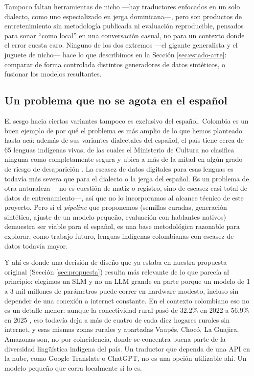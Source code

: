 \documentclass[11pt,a4paper]{article}
\begin{document}
Tampoco faltan herramientas de nicho —hay traductores enfocados en un solo dialecto, como uno especializado en jerga dominicana—, pero son productos de entretenimiento sin metodología publicada ni evaluación reproducible, pensados para sonar ``como local'' en una conversación casual, no para un contexto donde el error cuesta caro. Ninguno de los dos extremos —el gigante generalista y el juguete de nicho— hace lo que describimos en la Sección \ref{sec:estado-arte}: comparar de forma controlada distintos generadores de datos sintéticos, o fusionar los modelos resultantes.

\subsection{Un problema que no se agota en el español}

El sesgo hacia ciertas variantes tampoco es exclusivo del español. Colombia es un buen ejemplo de por qué el problema es más amplio de lo que hemos planteado hasta acá: además de sus variantes dialectales del español, el país tiene cerca de 65 lenguas indígenas vivas, de las cuales el Ministerio de Cultura no clasifica ninguna como completamente segura y ubica a más de la mitad en algún grado de riesgo de desaparición \cite{mincultura2025lenguas}. La escasez de datos digitales para esas lenguas es todavía más severa que para el dialecto o la jerga del español. Es un problema de otra naturaleza —no es cuestión de matiz o registro, sino de escasez casi total de datos de entrenamiento—, así que no lo incorporamos al alcance técnico de este proyecto. Pero si el \textit{pipeline} que proponemos (semillas curadas, generación sintética, ajuste de un modelo pequeño, evaluación con hablantes nativos) demuestra ser viable para el español, es una base metodológica razonable para explorar, como trabajo futuro, lenguas indígenas colombianas con escasez de datos todavía mayor.

Y ahí es donde una decisión de diseño que ya estaba en nuestra propuesta original (Sección \ref{sec:propuesta}) resulta más relevante de lo que parecía al principio: elegimos un SLM y no un LLM grande en parte porque un modelo de 1 a 3 mil millones de parámetros puede correr en hardware modesto, incluso sin depender de una conexión a internet constante. En el contexto colombiano eso no es un detalle menor: aunque la conectividad rural pasó de 32.2\% en 2022 a 56.9\% en 2025 \cite{dane2025conectividad}, eso todavía deja a más de cuatro de cada diez hogares rurales sin internet, y esas mismas zonas rurales y apartadas Vaupés, Chocó, La Guajira, Amazonas son, no por coincidencia, donde se concentra buena parte de la diversidad lingüística indígena del país. Un traductor que dependa de una API en la nube, como Google Translate o ChatGPT, no es una opción utilizable ahí. Un modelo pequeño que corra localmente sí lo es.
\end{document}
